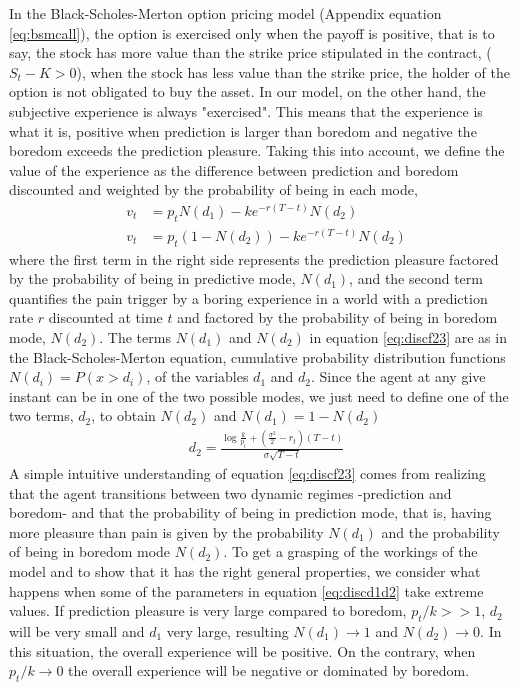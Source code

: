 \documentclass[11pt, onecolumn]{article}
\begin{document}
In the Black-Scholes-Merton option pricing model (Appendix equation \ref{eq:bsmcall}), the option is exercised only when the payoff is positive, that is to say, the stock  has more value than the strike price stipulated in the contract, ($S_t - K >0 $), when the stock has less value than the strike price, the holder of the option is not obligated to buy the asset. In our model, on the other hand, the subjective experience is always "exercised". This means that the experience is what it is, positive when prediction is larger than boredom and negative the boredom exceeds the prediction pleasure. Taking this into account, we define the value of the experience as the difference between prediction and boredom discounted and weighted by the probability of being in each mode,
\begin{equation}
\begin{split}
   &  v_t  & =  p_{t}N(d_1) - k e^{-r(T-t)}N(d_2) \\ 
   &  v_t  & =  p_{t}(1 - N(d_2)) - k e^{-r(T-t)}N(d_2) 
\end{split}
\label{eq:discf23}
\end{equation}
where the first term in the right side represents the prediction pleasure  factored by the probability of being in predictive mode, $N(d_1)$, and the second term quantifies the pain trigger by a boring experience in a world with a prediction rate $r$ discounted at time $t$ and factored by the probability of being in boredom mode, $N(d_2)$. The terms $N(d_1)$ and $N(d_2)$ in equation \ref{eq:discf23} are as in the Black-Scholes-Merton equation, cumulative probability distribution functions $N(d_i) = P(x > d_i)$, of the variables $d_1$ and $d_2$. Since the agent at any give instant can be in one of the two possible modes, we just need to define one of the two terms, $d_2$, to obtain $N(d_2)$ and $N(d_1) = 1 - N(d_2)$
\begin{equation}
\begin{split}
    & d_2 = \frac{\log \frac{k}{p_t}  + (\frac{\sigma ^2}{2} - r_t)(T-t)}{\sigma \sqrt{T-t}} 
\end{split}
\label{eq:discd1d2}
\end{equation}
A simple intuitive understanding of equation \ref{eq:discf23} comes from realizing that the agent transitions between two dynamic regimes -prediction and boredom- and that the probability of being in prediction mode, that is, having more pleasure than pain is given by the probability $N(d_1)$ and the probability of being in boredom mode $N(d_2)$. 
To get a grasping of the workings of the model and to show that it has the right general properties, we consider what happens when some of the parameters in  equation \ref{eq:discd1d2} take extreme values. If prediction pleasure is very large compared to boredom, $p_t/k >> 1$, $d_2$ will be very small and $d_1$ very large, resulting $N(d_1) \to 1$ and $N(d_2) \to 0$. In this situation, the overall experience will be positive. On the contrary, when $p_t/k \to 0$ the overall experience  will be negative or dominated by boredom. 
\end{document}
